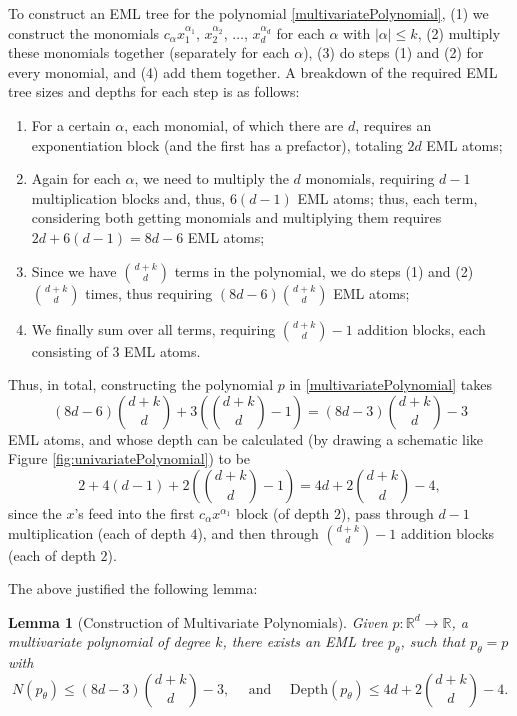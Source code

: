\documentclass{article}
\newtheorem{lem}{Lemma}
\numberwithin{Def}{section}
\newcommand{\R}{\mathbb R}
\begin{document}
To construct an EML tree for the polynomial \eqref{multivariatePolynomial}, (1) we construct the monomials $c_\alpha x_1^{\alpha_1}$, $x_2^{\alpha_2}$, $\dots$, $x_d^{\alpha_d}$ for each $\alpha$ with $|\alpha| \leq k$, (2) multiply these monomials together (separately for each $\alpha$), (3) do steps (1) and (2) for every monomial, and (4) add them together. A breakdown of the required EML tree sizes and depths for each step is as follows:
\begin{enumerate}[label=(\arabic*)]
    \item For a certain $\alpha$, each monomial, of which there are $d$, requires an exponentiation block (and the first has a prefactor), totaling $2d$ EML atoms;
    \item Again for each $\alpha$, we need to multiply the $d$ monomials, requiring $d-1$ multiplication blocks and, thus, $6(d-1)$ EML atoms; thus, each term, considering both getting monomials and multiplying them requires $2d + 6(d-1) = 8d - 6$ EML atoms; 
    \item Since we have $\binom{d+k}{d}$ terms in the polynomial, we do steps (1) and (2) $\binom{d+k}{d}$ times, thus requiring $(8d-6)\binom{d+k}{d}$ EML atoms;
    \item We finally sum over all terms, requiring $\binom{d+k}{d} - 1$ addition blocks, each consisting of $3$ EML atoms.
\end{enumerate}
Thus, in total, constructing the polynomial $p$ in \eqref{multivariatePolynomial} takes
\begin{equation}
    (8d-6) \binom{d+k}{d} + 3 \left( \binom{d+k}{d} - 1 \right) = (8d-3)\binom{d+k}{d} - 3
\end{equation}
EML atoms, and whose depth can be calculated (by drawing a schematic like Figure \ref{fig:univariatePolynomial}) to be
\begin{equation}
    2+4(d-1) + 2 \left( \binom{d+k}{d} - 1 \right) = 4d + 2 \binom{d+k}{d} -4,
\end{equation}
since the $x$'s feed into the first $c_\alpha x^{\alpha_1}$ block (of depth $2$), pass through $d-1$ multiplication (each of depth $4$), and then through $\binom{d+k}{d} - 1$ addition blocks (each of depth $2$).

The above justified the following lemma:
\begin{lem}[Construction of Multivariate Polynomials]
Given $p: \R^d \to \R$, a multivariate polynomial of degree $k$, there exists an EML tree $p_\theta$, such that $p_\theta = p$ with
\begin{equation}
    N(p_\theta) \leq (8d-3) \binom{d+k}{d} - 3, \quad \text{ and } \quad \text{Depth}(p_\theta) \leq 4d + 2 \binom{d+k}{d} - 4.
\end{equation}
\end{lem}
\end{document}
